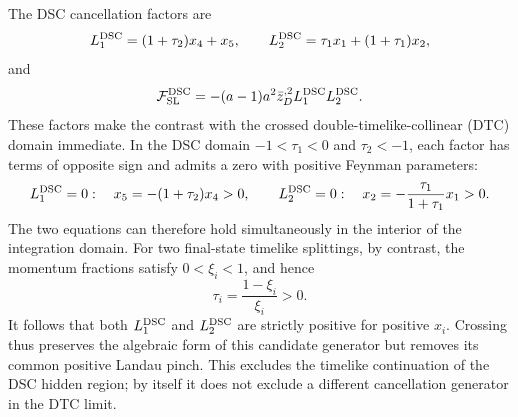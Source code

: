 \documentclass[11pt]{article}
\newcommand{\F}{\mathcal F}
\newcommand{\SL}{\mathrm{SL}}
\begin{document}
The DSC cancellation factors are
\begin{equation}
 L_1^{\rm DSC}=(1+\tau_2)x_4+x_5,\qquad
 L_2^{\rm DSC}=\tau_1x_1+(1+\tau_1)x_2,
 \label{eq:dsc-factors}
\end{equation}
and
\begin{equation}
 \F_{\SL}^{\rm DSC}=
 -(a-1)a^2\bar z_D^{,2}L_1^{\rm DSC}L_2^{\rm DSC}.
 \label{eq:dsc-fsl}
\end{equation}
These factors make the contrast with the crossed double-timelike-collinear
(DTC) domain immediate.  In the DSC domain
\(-1<\tau_1<0\) and \(\tau_2<-1\), each factor has terms of opposite sign
and admits a zero with positive Feynman parameters:
\begin{equation}
 L_1^{\rm DSC}=0:\quad
 x_5=-(1+\tau_2)x_4>0,
 \qquad
 L_2^{\rm DSC}=0:\quad
 x_2=-\frac{\tau_1}{1+\tau_1}x_1>0.
 \label{eq:dsc-positive-pinch}
\end{equation}
The two equations can therefore hold simultaneously in the interior of the
integration domain.  For two final-state timelike splittings, by contrast,
the momentum fractions satisfy \(0<\xi_i<1\), and hence
\begin{equation}
 \tau_i=\frac{1-\xi_i}{\xi_i}>0.
 \label{eq:dtc-tau-domain}
\end{equation}
It follows that both \(L_1^{\rm DSC}\) and \(L_2^{\rm DSC}\) are strictly
positive for positive \(x_i\).  Crossing thus preserves the algebraic form
of this candidate generator but removes its common positive Landau pinch.
This excludes the timelike continuation of the DSC hidden region; by itself
it does not exclude a different cancellation generator in the DTC limit.
\end{document}
